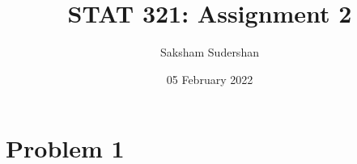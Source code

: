 \documentclass{article}
\title{ STAT 321: Assignment 2}
\author{Saksham Sudershan}
\date{05 February 2022}
\begin{document}
	\maketitle

	\section*{Problem 1}
	
\end{document}

